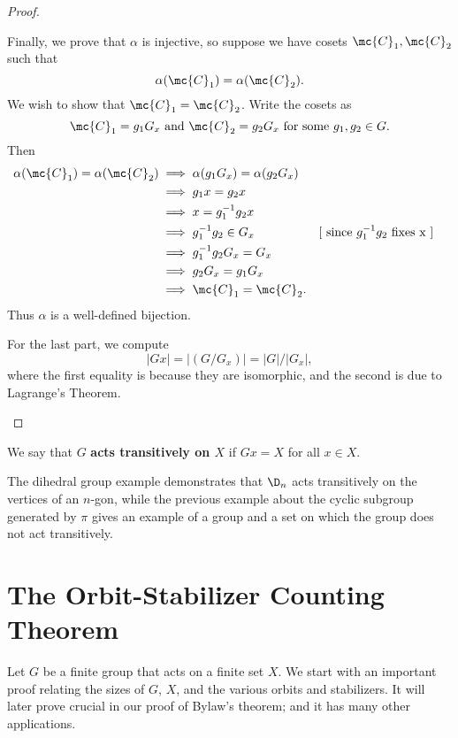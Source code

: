 \documentclass[math1530-lecture-notes]{subfiles}
\begin{document}
\begin{proof}[Proof]
\begin{enumerate}
      Finally, we prove that $\alpha$ is injective, so suppose we have cosets $\mc{C}_1, \mc{C}_2$
      such that \[
        \alpha(\mc{C}_1)=\alpha(\mc{C}_2)
      .\] We wish to show that $\mc{C}_1=\mc{C}_2$. Write the cosets as \[
        \mc{C}_1=g_1G_x~\text{and}~\mc{C}_2=g_2G_x~\text{for some}~g_1,g_2\in G
      .\] Then
      \begin{align*}
        \alpha(\mc{C}_1)=\alpha(\mc{C}_2)&\implies \alpha(g_1G_x)=\alpha(g_2G_x)\\
                                         &\implies g_1x=g_2x\\
                                         &\implies x=g_1^{-1}g_2x\\
                                         &\implies g_1^{-1}g_2\in G_x&&[~\text{since $g_1^{-1}g_2$
                                         fixes x}~]\\
                                         &\implies g_1^{-1}g_2G_x=G_x\\
                                         &\implies g_2G_x=g_1G_x\\
                                         &\implies \mc{C}_1=\mc{C}_2
      .\end{align*} Thus $\alpha$ is a well-defined bijection.

      For the last part, we compute \[
        \left| Gx \right| =\left| (G / G_x) \right| =\left| G \right| /\left| G_x \right| 
      ,\] where the first equality is because they are isomorphic, and the second is due to
      Lagrange's Theorem.
  \end{enumerate}
\end{proof}

\begin{definition}[Transitivity]{}
  We say that $G$ \textbf{acts transitively on $X$} if $Gx=X$ for all $x\in X$.
\end{definition}

The dihedral group example demonstrates that $\D_n$ acts transitively on the vertices of an $n$-gon,
while the previous example about the cyclic subgroup generated by $\pi$ gives an example of a group
and a set on which the group does not act transitively.


\section{The Orbit-Stabilizer Counting Theorem}

Let $G$ be a finite group that acts on a finite set $X$. We start with an important proof relating
the sizes of $G$, $X$, and the various orbits and stabilizers. It will later prove crucial in our
proof of Bylaw's theorem; and it has many other applications.
\end{document}
